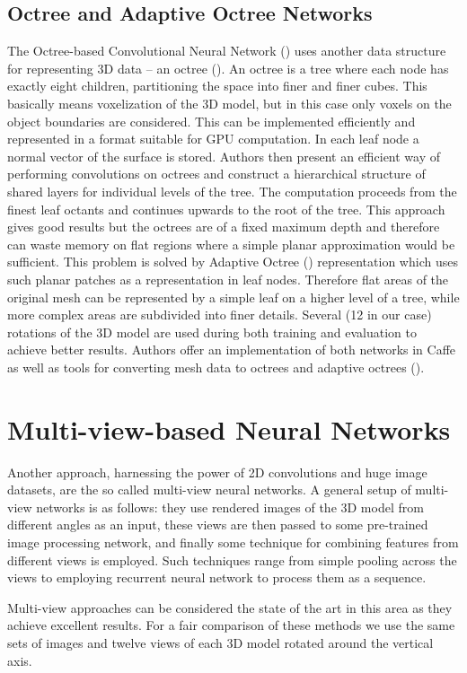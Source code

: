


\subsection{Octree and Adaptive Octree Networks}
The Octree-based Convolutional Neural Network (\cite{wang_o-cnn:_2017}) uses another data structure for representing 3D data -- an octree (\cite{meagher_octree_1980}). An octree is a tree where each node has exactly eight children, partitioning the space into finer and finer cubes. This basically means voxelization of the 3D model, but in this case only voxels on the object boundaries are considered. This can be implemented efficiently and represented in a format suitable for GPU computation. In each leaf node a normal vector of the surface is stored. Authors then present an efficient way of performing convolutions on octrees and construct a hierarchical structure of shared layers for individual levels of the tree. The computation proceeds from the finest leaf octants and continues upwards to the root of the tree.
This approach gives good results but the octrees are of a fixed maximum depth and therefore can waste memory on flat regions where a simple planar approximation would be sufficient. This problem is solved by Adaptive Octree (\cite{wang_adaptive_2018}) representation which uses such planar patches as a representation in leaf nodes. Therefore flat areas of the original mesh can be represented by a simple leaf on a higher level of a tree, while more complex areas are subdivided into finer details. 
Several (12 in our case) rotations of the 3D model are used during both training and evaluation to achieve better results.
Authors offer an implementation of both networks in Caffe as well as tools for converting mesh data to octrees and adaptive octrees (\cite{wang_o-cnn_2018}).

\section{Multi-view-based Neural Networks}
Another approach, harnessing the power of 2D convolutions and huge image datasets, are the so called multi-view neural networks.
A general setup of multi-view networks is as follows: they use rendered images of the 3D model from different angles as an input, these views are then passed to some pre-trained image processing network, and finally some technique for combining features from different views is employed. Such techniques range from simple pooling across the views to employing recurrent neural network to process them as a sequence.\par
Multi-view approaches can be considered the state of the art in this area as they achieve excellent results. For a fair comparison of these methods we use the same sets of images and twelve views of each 3D model rotated around the vertical axis.

